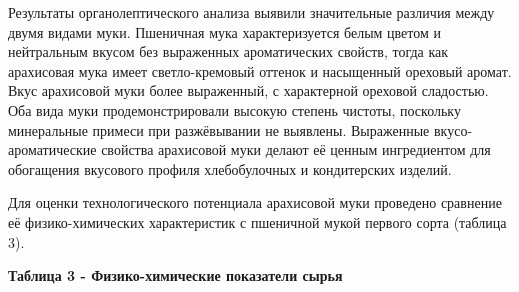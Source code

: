 {{{Результаты органолептического анализа выявили значительные различия
между двумя видами муки. Пшеничная мука характеризуется белым цветом и
нейтральным вкусом без выраженных ароматических свойств, тогда как
арахисовая мука имеет светло-кремовый оттенок и насыщенный ореховый
аромат. Вкус арахисовой муки более выраженный, с характерной ореховой
сладостью. Оба вида муки продемонстрировали высокую степень чистоты,
поскольку минеральные примеси при разжёвывании не выявлены. Выраженные
вкусо-ароматические свойства арахисовой муки делают её ценным
ингредиентом для обогащения вкусового профиля хлебобулочных и
кондитерских изделий.

Для оценки технологического потенциала арахисовой муки проведено
сравнение её физико-химических характеристик с пшеничной мукой первого
сорта (таблица 3).

{\bfseries Таблица 3 - Физико-химические показатели сырья}


}}}

